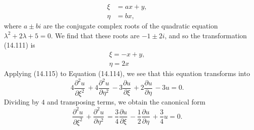 \documentclass[11pt,a4paper, twoside]{report}
\newcommand{\pf}[2]{\dfrac{\partial #1}{\partial #2}\,}
\newcommand{\pfn}[3]{\dfrac{\partial^#3 #1}{\partial #2^#3}\,}
\begin{document}
	\begin{equation}\tag{14.111}
		\begin{aligned}
			\xi &= ax + y,\\
			\eta &= bx,
		\end{aligned}
	\end{equation}
	where $a \pm bi$ are the conjugate complex roots of the quadratic equation $\lambda^2 + 2\lambda + 5 = 0$. We find that these roots are $-1 \pm 2i$, and so the transformation (14.111) is
	\begin{equation}\tag{14.115}
		\begin{aligned}
			\xi = -x + y,\\
			\eta = 2x
		\end{aligned}
	\end{equation}
	Applying (14.115) to Equation (14.114), we see that this equation transforms into
	$$
	4\pfn{u}{\xi}{2} + 4\pfn{u}{\eta}{2} - 3\pf{u}{\xi} + 2\pf{u}{\eta} - 3u = 0.
	$$
	Dividing by $4$ and transposing terms, we obtain the canonical form
	$$
	\pfn{u}{\xi}{2} + \pfn{u}{\eta}{2} = \frac{3}{4}\pf{u}{\xi} - \frac{1}{2}\pf{u}{\eta} + \frac{3}{4}u = 0.
	$$
\end{document}
